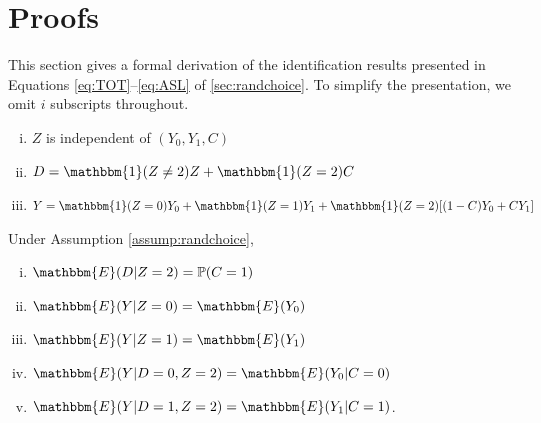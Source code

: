 \documentclass[12pt, a4paper, colorinlistoftodos]{article}
\begin{document}
\begingroup
{}

%
%


\endgroup

\appendix

\section{Proofs}
\label{sec:proofs}

This section gives a formal derivation of the identification results presented in Equations \eqref{eq:TOT}--\eqref{eq:ASL} of \autoref{sec:randchoice}.
To simplify the presentation, we omit $i$ subscripts throughout.

\begin{assumption}\mbox{}
\label{assump:randchoice}
   \begin{enumerate}[(i)]
   \item $Z$ is independent of $(Y_{0}, Y_{1}, C)$
   \item $D = \mathbbm{1}(Z \neq 2)Z + \mathbbm{1}(Z = 2)C$
   \item $Y = \mathbbm{1}(Z = 0) Y_{0} + \mathbbm{1}(Z = 1) Y_{1} + \mathbbm{1}(Z = 2) [ (1 - C) Y_{0} + C Y_{1}]$
   \end{enumerate}
\end{assumption}

\begin{lem}
Under Assumption \ref{assump:randchoice},
\label{lem_randchoice}
   \begin{enumerate}[(i)]
       \item $\mathbbm{E}(D|Z=2) = \mathbb{P}(C=1)$
       \item $\mathbbm{E}(Y|Z=0) = \mathbbm{E}(Y_0)$
       \item $\mathbbm{E}(Y|Z=1) = \mathbbm{E}(Y_1)$
       \item $\mathbbm{E}(Y|D=0,Z=2) = \mathbbm{E}(Y_0|C=0)$
       \item $\mathbbm{E}(Y|D=1,Z=2) = \mathbbm{E}(Y_1|C=1)$.
   \end{enumerate} 
\end{lem}
\end{document}
